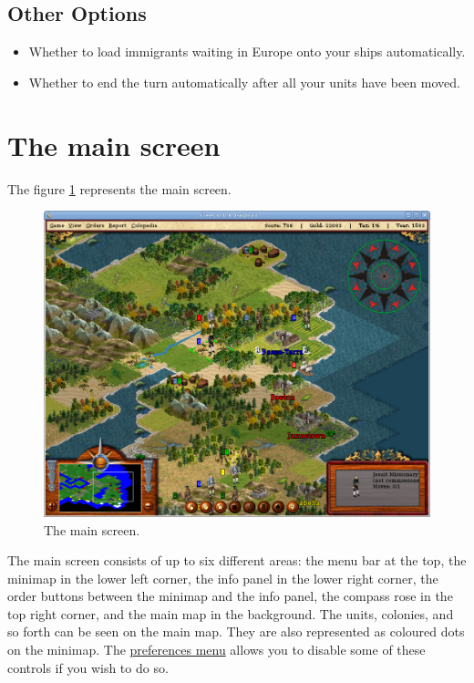 \documentclass[12pt]{book}
\begin{document}
\hypertarget{other options}{\subsection{Other Options}}

\begin{itemize}
\item Whether to load immigrants waiting in Europe onto your ships
  automatically.
\item Whether to end the turn automatically after all your units have
  been moved.
\end{itemize}


\hypertarget{main screen}{\section{The main screen}}

The figure \ref{main_screen_fig} represents the main screen.
\begin{figure}[htb]
  \begin{center}
    \includegraphics[scale=0.35]{images/main_screen.png}
    \caption{The main screen.\label{main_screen_fig}}
  \end{center}
\end{figure}

The main screen consists of up to six different areas: the menu bar at
the top, the minimap in the lower left corner, the info panel in the
lower right corner, the order buttons between the minimap and the info
panel, the compass rose in the top right corner, and the main map in
the background. The units, colonies, and so forth can be seen on the
main map. They are also represented as coloured dots on the minimap.
The \hyperlink{Client options}{preferences menu} allows you to disable
some of these controls if you wish to do so.
\end{document}

